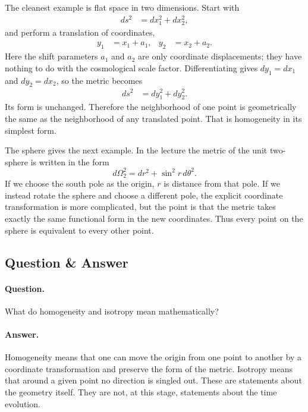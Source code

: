 The cleanest example is flat space in two dimensions. Start with
\begin{align}
ds^2 &= dx_1^2 + dx_2^2 ,
\end{align}
and perform a translation of coordinates,
\begin{align}
y_1 &= x_1 + a_1, &
y_2 &= x_2 + a_2 .
\end{align}
Here the shift parameters \(a_1\) and \(a_2\) are only coordinate displacements; they have nothing to do with the cosmological scale factor. Differentiating gives \(dy_1=dx_1\) and \(dy_2=dx_2\), so the metric becomes
\begin{align}
ds^2 &= dy_1^2 + dy_2^2 .
\end{align}
Its form is unchanged. Therefore the neighborhood of one point is geometrically the same as the neighborhood of any translated point. That is homogeneity in its simplest form.

The sphere gives the next example. In the lecture the metric of the unit two-sphere is written in the form
\begin{equation}
d\Omega_2^2 = dr^2 + \sin^2 r\, d\theta^2 .
\end{equation}
If we choose the south pole as the origin, \(r\) is distance from that pole. If we instead rotate the sphere and choose a different pole, the explicit coordinate transformation is more complicated, but the point is that the metric takes exactly the same functional form in the new coordinates. Thus every point on the sphere is equivalent to every other point.

\subsection{Question \& Answer}

\paragraph{Question.} What do homogeneity and isotropy mean mathematically?

\paragraph{Answer.} Homogeneity means that one can move the origin from one point to another by a coordinate transformation and preserve the form of the metric. Isotropy means that around a given point no direction is singled out. These are statements about the geometry itself. They are not, at this stage, statements about the time evolution.

